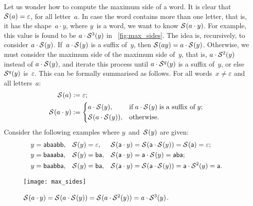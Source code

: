 Let us wonder how to compute the maximum side of a word. It is clear
that \(\mathcal{S}^{}(a) = \varepsilon\), for all letter~\(a\). In case the
word contains more than one letter, that is, it has the shape~\({a
  \cdot y}\), where \(y\)~is a word, we want to know \(\mathcal{S}^{}(a
  \cdot y)\). For example, this value is found to be \(a \cdot
\mathcal{S}^{3}(y)\) in \fig~\vref{fig:max_sides}. The idea is,
recursively, to consider \(a \cdot \mathcal{S}^{}(y)\). If~\({a \cdot
  \mathcal{S}^{}(y)}\) is a suffix of~\(y\), then \(\mathcal{S}^{}(ay) = a \cdot
\mathcal{S}^{}(y)\). Otherwise, we must consider the maximum side of the
maximum side of~\(y\), that is, \(a \cdot \mathcal{S}^{2}(y)\) instead of
\(a \cdot \mathcal{S}^{}(y)\), and iterate this process until \(a \cdot
\mathcal{S}^{q}(y)\) is a suffix of~\(y\), or else \(\mathcal{S}^{q}(y)\)
is~\(\varepsilon\). This can be formally summarised as follows. For
all words~\({x \neq \varepsilon}\) and all letters~\(a\):
\begin{equation}
\begin{aligned}
  \mathcal{S}^{}(a)         &:= \varepsilon;\\
  \mathcal{S}^{}(a \cdot y) &:= \left\{
    \begin{aligned}
      & a \cdot \mathcal{S}^{}(y),
      && \text{if} \; a \cdot \mathcal{S}^{}(y) \; \text{is a suffix of} \;
         y;\\
      & \mathcal{S}^{}(a \cdot \mathcal{S}^{}(y)),
      && \text{otherwise.}
    \end{aligned}
  \right.
\end{aligned}
\label{eq:B}
\end{equation}
Consider the following examples where \(y\)~and~\(\mathcal{S}^{}(y)\) are
given:
\begin{align*}
  y             &= \textsf{abaabb},
& \mathcal{S}^{}(y)  &= \varepsilon,
& \mathcal{S}^{}(\textsf{a} \cdot y)
                &= \mathcal{S}^{}(\textsf{a} \cdot \mathcal{S}^{}(y))
                 = \mathcal{S}^{}(\textsf{a}) = \varepsilon;\\
  y             &= \textsf{baaaba},
& \mathcal{S}^{}(y)  &= \textsf{ba},
& \mathcal{S}^{}(\textsf{a} \cdot y)
                &= \textsf{a} \cdot \mathcal{S}^{}(y)
                 = \textsf{aba};\\
  y             &= \textsf{baabba},
& \mathcal{S}^{}(y)  &= \textsf{ba},
& \mathcal{S}^{}(\textsf{a} \cdot y)
                &= \mathcal{S}^{}(\textsf{a} \cdot \mathcal{S}^{}(y))
                 = \textsf{a} \cdot \mathcal{S}^{2}(y)
                 = \textsf{a}.
\end{align*}
\begin{figure}[b]
\centering
\texttt{[image: max\_sides]}
\caption{\(\mathcal{S}^{}(a \cdot y)
   = \mathcal{S}^{}(a \cdot \mathcal{S}^{}(y))
   = \mathcal{S}^{}(a \cdot \mathcal{S}^{2}(y))
   = a \cdot \mathcal{S}^{3}(y)\).
\label{fig:max_sides}}
\end{figure}
